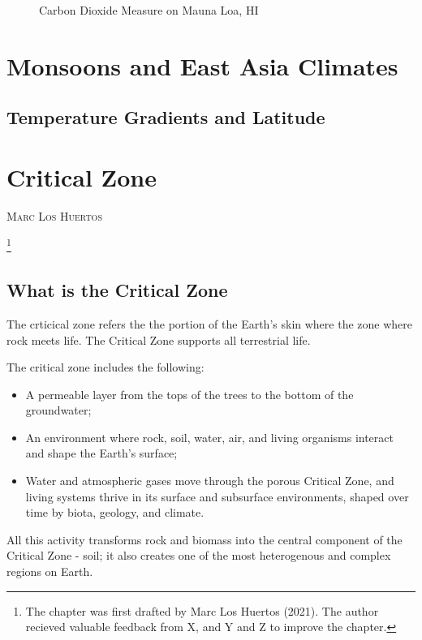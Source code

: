 \documentclass{book}\usepackage{knitr}
\makeatletter
\newcommand{\chapterauthor}[1]{%
  {\parindent0pt\vspace*{-25pt}%
  \linespread{1.1}\large\scshape#1%
  \par\nobreak\vspace*{35pt}}
  \@afterheading%
}
\makeatother
\begin{document}
\begin{knitrout}
\begin{kframe}
\begin{figure}
\begin{knitrout}
\end{knitrout}
\caption{Carbon Dioxide Measure on Mauna Loa, HI}
\label{fig:maunaloa2}
\end{figure}






\chapter{Monsoons and East Asia Climates}

\section{Temperature Gradients and Latitude}





\chapter{Critical Zone}\label{ch:critical-zone}

\chapterauthor{Marc Los Huertos}\footnote{The chapter was first drafted by Marc Los Huertos (2021). The author recieved valuable feedback from X, and Y and Z to improve the chapter.}

\section{What is the Critical Zone}

The crticical zone refers the the portion of the Earth's skin where the zone where rock meets life. The Critical Zone supports all terrestrial life.

The critical zone includes the following:

\begin{itemize}
  \item A permeable layer from the tops of the trees to the bottom of the groundwater;
  \item An environment where rock, soil, water, air, and living organisms interact and shape the Earth's surface;
  \item Water and atmospheric gases move through the porous Critical Zone, and living systems thrive in its surface and subsurface environments, shaped over time by biota, geology, and climate.
\end{itemize}

All this activity transforms rock and biomass into the central component of the Critical Zone - soil; it also creates one of the most heterogenous and complex regions on Earth.


\end{kframe}
\end{knitrout}
\end{document}
